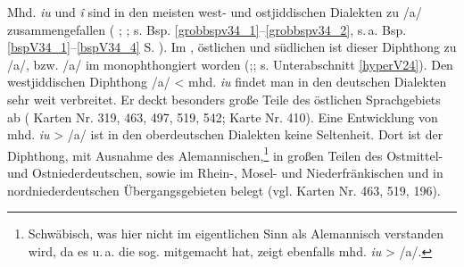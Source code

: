 Mhd. \textit{iu} und \textit{î} sind in den meisten west- und ostjiddischen Dialekten zu /a\textsubarch{\textsci}/ zusammengefallen ( \cite[77]{Herzog1992}; \cite[206]{Timm1987}; s. Bsp. \ref{grobbspv34_1}--\ref{grobbspv34_2}, s.\,a. Bsp. \ref{bspV34_1}–\ref{bspV34_4} S. \pageref{bspV34_1}). Im , östlichen  und südlichen  ist dieser Diphthong zu /a\textlengthmark/, bzw. /a/ im  monophthongiert worden (\cite[77]{Herzog1992};\cite[206]{Timm1987}; s. Unterabschnitt \ref{hyperV24}). Den westjiddischen Diphthong /a\textsubarch{\textsci}/ < mhd. \textit{iu} findet man in den deutschen Dialekten sehr weit verbreitet. Er deckt besonders große Teile des östlichen Sprachgebiets ab ( Karten Nr. 319, 463, 497, 519, 542;  Karte Nr. 410). Eine Entwicklung von mhd.  \textit{iu} > /a\textsubarch{\textsci}/ ist in den oberdeutschen Dialekten keine Seltenheit. Dort ist der Diphthong, mit Ausnahme des Alemannischen,\footnote{Schwäbisch, was hier nicht im eigentlichen Sinn als Alemannisch verstanden wird, da es u.\,a. die sog.  mitgemacht hat, zeigt ebenfalls mhd.  \textit{iu} > /a\textsubarch{\textsci}/.} in großen Teilen des Ostmittel- und Ostniederdeutschen, sowie im Rhein-, Mosel- und Niederfränkischen und in nordniederdeutschen Übergangsgebieten belegt (vgl. Karten Nr. 463, 519, 196). \\






